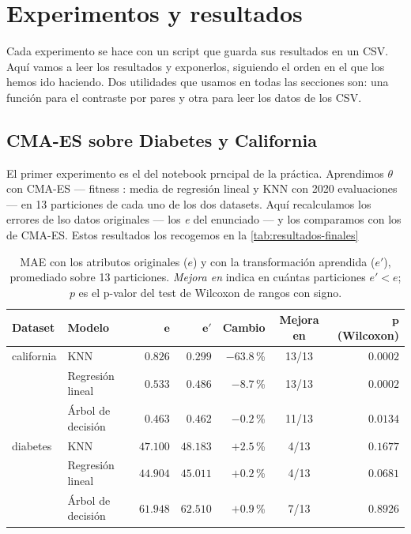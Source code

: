 \section{Experimentos y resultados}
Cada experimento se hace con un script que guarda sus resultados en un CSV. Aquí vamos a leer los resultados y exponerlos, siguiendo el orden en el que los hemos ido haciendo. Dos utilidades que usamos en todas las secciones son: una función para el contraste por pares y otra para leer los datos de los CSV.

\subsection{CMA-ES sobre Diabetes y California}
El primer experimento es el del notebook prncipal de la práctica. Aprendimos $\theta$ con CMA-ES --- fitness : media de regresión lineal y KNN con 2020 evaluaciones --- en 13 particiones de cada uno de los dos datasets. Aquí recalculamos los errores de lso datos originales --- los \textit{e} del enunciado --- y los comparamos con los de CMA-ES. Estos resultados los recogemos en la \autoref{tab:resultados-finales}

\begin{table}[h]
\centering
\begin{tabular}{llrrrcr}
\hline
\textbf{Dataset} & \textbf{Modelo} & $\boldsymbol{e}$ & $\boldsymbol{e'}$ & \textbf{Cambio} & \textbf{Mejora en} & $\boldsymbol{p}$ \textbf{(Wilcoxon)} \\
\hline
california & KNN               & $0.826$  & $0.299$  & $-63.8$\,\% & 13/13 & $0.0002$ \\
           & Regresión lineal  & $0.533$  & $0.486$  & $-8.7$\,\%  & 13/13 & $0.0002$ \\
           & Árbol de decisión & $0.463$  & $0.462$  & $-0.2$\,\%  & 11/13 & $0.0134$ \\
\hline
diabetes   & KNN               & $47.100$ & $48.183$ & $+2.5$\,\%  & 4/13  & $0.1677$ \\
           & Regresión lineal  & $44.904$ & $45.011$ & $+0.2$\,\%  & 4/13  & $0.0681$ \\
           & Árbol de decisión & $61.948$ & $62.510$ & $+0.9$\,\%  & 7/13  & $0.8926$ \\
\hline
\end{tabular}
\caption{MAE con los atributos originales ($e$) y con la transformación aprendida ($e'$), promediado sobre 13 particiones. \emph{Mejora en} indica en cuántas particiones $e' < e$; $p$ es el p-valor del test de Wilcoxon de rangos con signo.}
\label{tab:resultados-finales}
\end{table}

